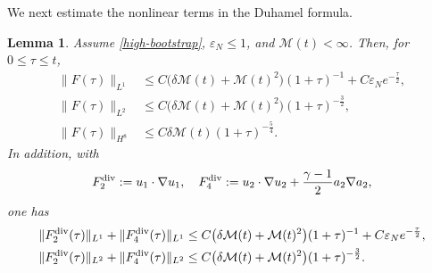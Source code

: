 \documentclass[10pt,reqno]{amsart}
\numberwithin{equation}{section}
\newtheorem{lem}[thm]{Lemma}
\begin{document}
We next estimate the nonlinear terms in the Duhamel formula.

\begin{lem}\label{lem-nonlinear-source}
Assume \eqref{high-bootstrap}, $\varepsilon_N\le1$, and
$\mathcal M(t)<\infty$. Then, for
$0\le\tau\le t$,
\begin{align}\label{source-L1}
\|F(\tau)\|_{L^1}
&\le C\big(\delta\mathcal M(t)+\mathcal M(t)^2\big)(1+\tau)^{-1}
+C\varepsilon_Ne^{-\frac{\tau}{2}},\\
\label{source-L2}
\|F(\tau)\|_{L^2}
&\le C\big(\delta\mathcal M(t)+\mathcal M(t)^2\big)(1+\tau)^{-\frac{3}{2}},\\
\label{source-H8}
\|F(\tau)\|_{H^8}
&\le C\delta\mathcal M(t)(1+\tau)^{-\frac{5}{4}}.
\end{align}
In addition, with
\[
F_2^{\rm div}:=u_1\cdot\nabla u_1,\quad
F_4^{\rm div}:=u_2\cdot\nabla u_2+\frac{\gamma-1}{2}a_2\nabla a_2,
\]
one has
\begin{align}\label{vector-source-L1L2}
\begin{aligned}
\|F_2^{\rm div}(\tau)\|_{L^1}+\|F_4^{\rm div}(\tau)\|_{L^1} &\le C\big(\delta\mathcal M(t)+\mathcal M(t)^2\big)(1+\tau)^{-1} +C\varepsilon_Ne^{-\frac{\tau}{2}},\\
\|F_2^{\rm div}(\tau)\|_{L^2}+\|F_4^{\rm div}(\tau)\|_{L^2} &\le C\big(\delta\mathcal M(t)+\mathcal M(t)^2\big)(1+\tau)^{-\frac{3}{2}}.
\end{aligned}
\end{align}
\end{lem}
\end{document}
